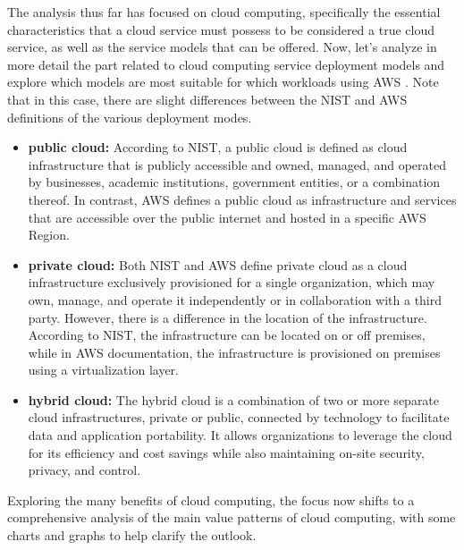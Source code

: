 The analysis thus far has focused on cloud computing, specifically the essential characteristics that a cloud service must possess to be considered a true cloud service, as well as the service models that can be offered. Now, let's analyze in more detail the part related to cloud computing service deployment models and explore which models are most suitable for which workloads using AWS \cite{AWSPrivatePublicHybrid}. Note that in this case, there are slight differences between the NIST and AWS definitions of the various deployment modes.
\begin{itemize}
    \item \textbf{public cloud: } According to NIST, a public cloud is defined as cloud infrastructure that is publicly accessible and owned, managed, and operated by businesses, academic institutions, government entities, or a combination thereof. In contrast, AWS defines a public cloud as infrastructure and services that are accessible over the public internet and hosted in a specific AWS Region.
    \item \textbf{private cloud: } Both NIST and AWS define private cloud as a cloud infrastructure exclusively provisioned for a single organization, which may own, manage, and operate it independently or in collaboration with a third party. However, there is a difference in the location of the infrastructure. According to NIST, the infrastructure can be located on or off premises, while in AWS documentation, the infrastructure is provisioned on premises using a virtualization layer.
    \item \textbf{hybrid cloud: } The hybrid cloud is a combination of two or more separate cloud infrastructures, private or public, connected by technology to facilitate data and application portability. It allows organizations to leverage the cloud for its efficiency and cost savings while also maintaining on-site security, privacy, and control.
\end{itemize}

Exploring the many benefits of cloud computing, the focus now shifts to a comprehensive analysis of the main value patterns of cloud computing, with some charts and graphs to help clarify the outlook.

